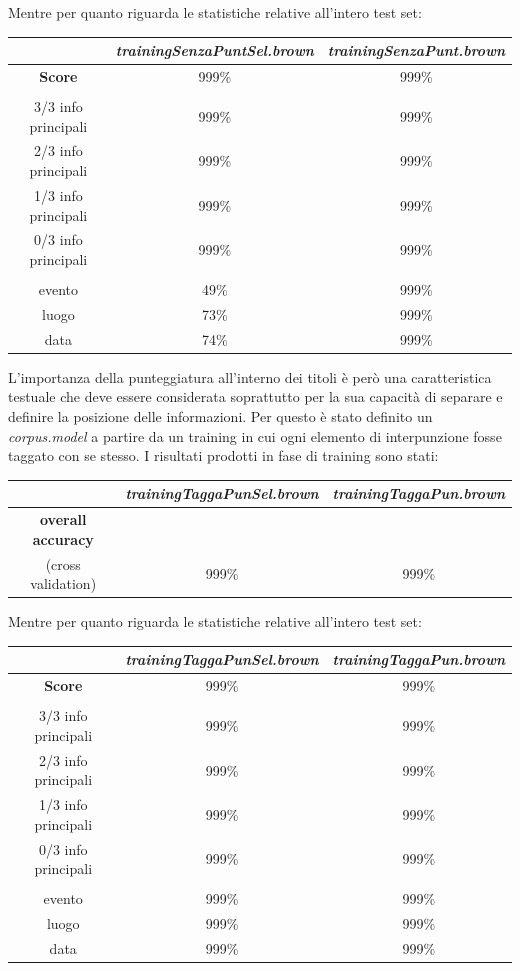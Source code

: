 \documentclass[a4paper]{report}
\begin{document}
Mentre per quanto riguarda le statistiche relative all'intero test set:
\begin{center}
\begin{tabular}{|ccc|}
\hline
 & \textit{trainingSenzaPuntSel.brown} & \textit{trainingSenzaPunt.brown}\\
\hline
\textbf{Score} & 999\% & 999\% \\
\hline
 & &  \\
\hline
3/3 info principali & 999\% & 999\% \\
2/3 info principali & 999\% & 999\% \\
1/3 info principali & 999\% & 999\% \\
0/3 info principali & 999\% & 999\% \\
\hline
 & &  \\
\hline
evento & 49\% & 999\% \\
luogo & 73\% & 999\% \\
data & 74\% & 999\% \\
\hline
\end{tabular}
\end{center}
L'importanza della punteggiatura all'interno dei titoli è però una caratteristica testuale che deve essere considerata soprattutto per la sua capacità di separare e definire la posizione delle informazioni. Per questo è stato definito un \textit{corpus.model} a partire da un training in cui ogni elemento di interpunzione fosse taggato con se stesso.  I risultati prodotti in fase di training sono stati:
\begin{center}
\begin{tabular}{c c c}
\hline
 & \textit{trainingTaggaPunSel.brown} & \textit{trainingTaggaPun.brown}\\
\hline
\textbf{overall accuracy} \\ (cross validation) & 999\% & 999\% \\
\hline
\end{tabular}
\end{center}
Mentre per quanto riguarda le statistiche relative all'intero test set:
\begin{center}
\begin{tabular}{|ccc|}
\hline
 & \textit{trainingTaggaPunSel.brown} & \textit{trainingTaggaPun.brown}\\
\hline
\textbf{Score} & 999\% & 999\% \\
\hline
 & &  \\
\hline
3/3 info principali & 999\% & 999\% \\
2/3 info principali & 999\% & 999\% \\
1/3 info principali & 999\% & 999\% \\
0/3 info principali & 999\% & 999\% \\
\hline
 & &  \\
\hline
evento & 999\% & 999\% \\
luogo & 999\% & 999\% \\
data & 999\% & 999\% \\
\hline
\end{tabular}
\end{center}
\end{document}
